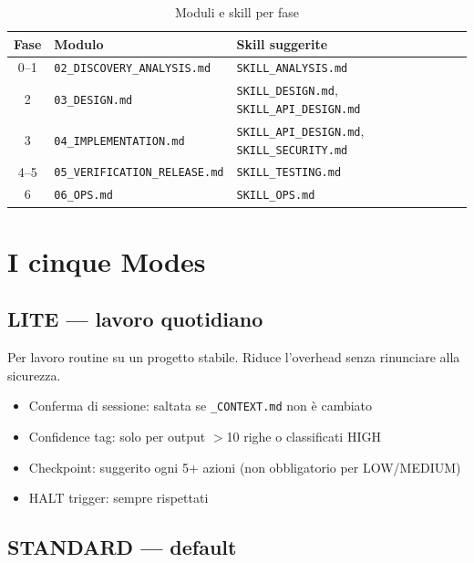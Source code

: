 \begin{table}[htbp]
  \centering
  \begin{tabular}{cll}
    \toprule
    \textbf{Fase} & \textbf{Modulo} & \textbf{Skill suggerite} \\
    \midrule
    0--1 & \texttt{02\_DISCOVERY\_ANALYSIS.md} & \texttt{SKILL\_ANALYSIS.md} \\
    2 & \texttt{03\_DESIGN.md} & \texttt{SKILL\_DESIGN.md}, \texttt{SKILL\_API\_DESIGN.md} \\
    3 & \texttt{04\_IMPLEMENTATION.md} & \texttt{SKILL\_API\_DESIGN.md}, \texttt{SKILL\_SECURITY.md} \\
    4--5 & \texttt{05\_VERIFICATION\_RELEASE.md} & \texttt{SKILL\_TESTING.md} \\
    6 & \texttt{06\_OPS.md} & \texttt{SKILL\_OPS.md} \\
    \bottomrule
  \end{tabular}
  \caption{Moduli e skill per fase}
  \label{tab:06-moduli-fasi}
\end{table}


\section{I cinque Modes}
\label{sec:06-cinque-modes}

\subsection*{LITE --- lavoro quotidiano}

Per lavoro routine su un progetto stabile. Riduce l'overhead senza rinunciare alla sicurezza.

\begin{itemize}
  \item Conferma di sessione: saltata se \texttt{\_CONTEXT.md} non è cambiato
  \item Confidence tag: solo per output $>$10 righe o classificati HIGH
  \item Checkpoint: suggerito ogni 5+ azioni (non obbligatorio per LOW/MEDIUM)
  \item HALT trigger: sempre rispettati
\end{itemize}

\subsection*{STANDARD --- default}


